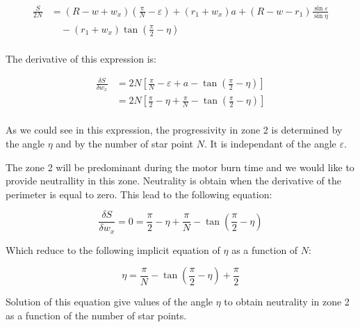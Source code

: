 \documentclass[11pt, titlepage]{article}
\begin{document}
\begin{equation}
 \begin{split}
  \frac{S}{2N} &= (R-w+w_x)(\frac{\pi}{N} - \varepsilon) +
                 (r_1+w_x)a+(R-w-r_1)\frac{\sin{\varepsilon}}{\sin{\eta}}\\ 
               & \quad - (r_1+w_x)\tan{(\frac{\pi}{2}-\eta)}\\
 \end{split}
\end{equation}

  The derivative of this expression is:

 \begin{equation}
  \begin{split}
   \frac{\delta S}{\delta w_x} &= 2N\left[ \frac{\pi}{N} -\varepsilon +
                                  a - \tan{(\frac{\pi}{2} - \eta)} \right]\\
                               &= 2N\left[ \frac{\pi}{2} - \eta +
                                  \frac{\pi}{N} - \tan{(\frac{\pi}{2}
                                  - \eta)} \right]\\
  \end{split}  
 \end{equation}

  As we could see in this expression, the progressivity in zone 2 is
  determined by the angle $\eta$ and by the number of star point
  $N$. It is independant of the angle $\varepsilon$.

  The zone 2 will be predominant during the motor burn time and we
  would like to provide neutrallity in this zone. Neutrality is obtain
  when the derivative of the perimeter is equal to zero. This lead to
  the following equation:

\begin{equation}
  \frac{\delta S}{\delta w_x} = 0 = \frac{\pi}{2} - \eta +
                                   \frac{\pi}{N} - \tan{(\frac{\pi}{2}
                                   - \eta)}
\end{equation}

  Which reduce to the following implicit equation of $\eta$ as a
  function of $N$:


\begin{equation}
\eta = \frac{\pi}{N} - \tan{(\frac{\pi}{2} - \eta)} + \frac{\pi}{2}
\end{equation}

  Solution of this equation give values of the angle $\eta$ to obtain
  neutrality in zone 2 as a function of the number of star points.
\end{document}
